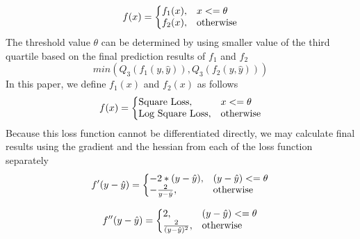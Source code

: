 \documentclass[runningheads]{llncs}
\begin{document}
\begin{equation}
  f(x)=\left\{
  \begin{array}{@{}ll@{}}
    f_1(x), & x<=\theta \\
    f_2(x), & \text{otherwise}
  \end{array}\right.
\end{equation}
The threshold value $\theta$ can be determined by using smaller value of the third quartile based on the final prediction results of $f_1$ and $f_2$
\begin{equation}
    min(Q_3(f_1(y, \hat{y})), Q_3(f_2(y, \hat{y})))
\end{equation}
In this paper, we define $f_1(x)$ and $f_2(x)$ as follows
\begin{equation}
  f(x)=\left\{
  \begin{array}{@{}ll@{}}
    \text{Square Loss}, & x<=\theta \\
    \text{Log Square Loss}, & \text{otherwise}
  \end{array}\right.
\end{equation}
Because this loss function cannot be differentiated directly, we may calculate final results using the gradient and the hessian from each of the loss function separately
\begin{equation}
  f'(y - \hat{y})=\left\{
  \begin{array}{@{}ll@{}}
    -2*(y - \hat{y}), &  (y - \hat{y})<=\theta \\
    -\frac{2}{y - \hat{y}}, & \text{otherwise}
  \end{array}\right.
\end{equation}

\begin{equation}
  f''(y - \hat{y})=\left\{
  \begin{array}{@{}ll@{}}
    2, & (y - \hat{y})<=\theta \\
    \frac{2}{(y - \hat{y})^2}, & \text{otherwise}
  \end{array}\right.
\end{equation}

\end{document}
